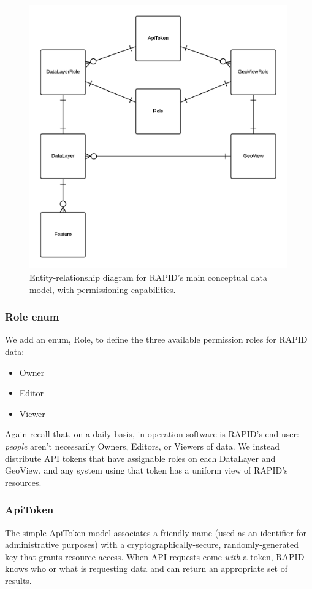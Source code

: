 \begin{figure}[ht]
    \centering
    \includegraphics[width=0.99\textwidth]{figures/er.png}
    \caption{Entity-relationship diagram for RAPID's main conceptual data model, with permissioning capabilities.}
    \label{fig:er}
\end{figure}

\subsubsection{Role enum}
We add an enum, Role, to define the three available permission roles for RAPID data:
\begin{itemize}

  \item Owner
  \item Editor 
  \item Viewer
  \end{itemize}

Again recall that, on a daily basis, in-operation software is RAPID's end user: \textit{people} aren't necessarily Owners, Editors, or Viewers of data. We instead distribute API tokens that have assignable roles on each DataLayer and GeoView, and any system using that token has a uniform view of RAPID's resources.

\subsubsection{ApiToken}
The simple ApiToken model associates a friendly name (used as an identifier for administrative purposes) with a cryptographically-secure, randomly-generated key that grants resource access. When API requests come \textit{with} a token, RAPID knows who or what is requesting data and can return an appropriate set of results.

